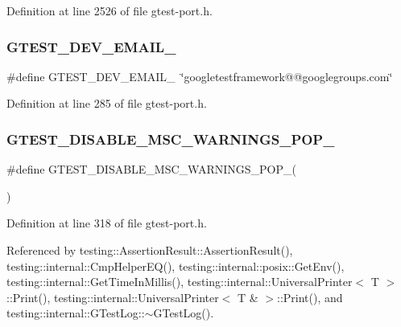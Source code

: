Definition at line 2526 of file gtest-\/port.\+h.

\mbox{\label{gtest-port_8h_a21086d276b1a64d6763ee8a94b12c1b8}} 
\subsubsection{\texorpdfstring{G\+T\+E\+S\+T\+\_\+\+D\+E\+V\+\_\+\+E\+M\+A\+I\+L\+\_\+}{GTEST\_DEV\_EMAIL\_}}
{\footnotesize\ttfamily \#define G\+T\+E\+S\+T\+\_\+\+D\+E\+V\+\_\+\+E\+M\+A\+I\+L\+\_\+~\char`\"{}googletestframework@@googlegroups.\+com\char`\"{}}



Definition at line 285 of file gtest-\/port.\+h.

\mbox{\label{gtest-port_8h_ab4c44546d6d9aced68993b87b608fc06}} 
\subsubsection{\texorpdfstring{G\+T\+E\+S\+T\+\_\+\+D\+I\+S\+A\+B\+L\+E\+\_\+\+M\+S\+C\+\_\+\+W\+A\+R\+N\+I\+N\+G\+S\+\_\+\+P\+O\+P\+\_\+}{GTEST\_DISABLE\_MSC\_WARNINGS\_POP\_}}
{\footnotesize\ttfamily \#define G\+T\+E\+S\+T\+\_\+\+D\+I\+S\+A\+B\+L\+E\+\_\+\+M\+S\+C\+\_\+\+W\+A\+R\+N\+I\+N\+G\+S\+\_\+\+P\+O\+P\+\_\+(\begin{DoxyParamCaption}{ }\end{DoxyParamCaption})}



Definition at line 318 of file gtest-\/port.\+h.



Referenced by testing\+::\+Assertion\+Result\+::\+Assertion\+Result(), testing\+::internal\+::\+Cmp\+Helper\+E\+Q(), testing\+::internal\+::posix\+::\+Get\+Env(), testing\+::internal\+::\+Get\+Time\+In\+Millis(), testing\+::internal\+::\+Universal\+Printer$<$ T $>$\+::\+Print(), testing\+::internal\+::\+Universal\+Printer$<$ T \& $>$\+::\+Print(), and testing\+::internal\+::\+G\+Test\+Log\+::$\sim$\+G\+Test\+Log().


